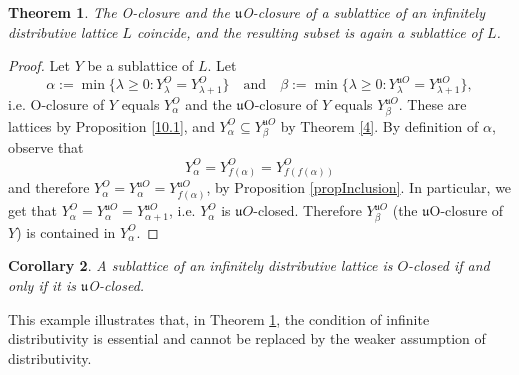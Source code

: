 \documentclass[12pt,a4paper]{amsart}
\numberwithin{equation}{section}
\newtheorem{thm}{Theorem}
\newtheorem{cor}[thm]{Corollary}
\theoremstyle{definition}
\newcommand{\sss}[1]{{\scriptscriptstyle #1}}
\begin{document}
\begin{thm}\label{Thmsublattice}
The O-closure and the $\mathfrak u$O-closure of a sublattice of an infinitely distributive lattice $ L$ coincide, and the resulting subset is again a sublattice of ${L}$.
\end{thm}
\begin{proof}
Let $Y$ be a sublattice of $ L$.  Let 
\[\alpha:=\min\{\lambda\ge 0:Y^{\sss{O}}_\lambda=Y^{\sss{O}}_{\lambda+1}\}\quad\text{and}\quad\beta:=\min\{\lambda\ge 0:Y^{\sss{\mathfrak{u}O}}_\lambda=Y^{\sss{\mathfrak{u}O}}_{\lambda+1}\},\]
i.e. O-closure of $Y$ equals $Y^{\sss{O}}_\alpha$ and the $\mathfrak{u}$O-closure of $Y$ equals $Y^{\sss{\mathfrak{u}O}}_\beta$. These are lattices by Proposition \ref{10.1}, and $Y^{\sss{O}}_\alpha\subseteq Y^{\sss{\mathfrak{u}O}}_\beta$ by Theorem \ref{4}.  By definition of $\alpha$, observe that
\[Y^{\sss{O}}_\alpha=Y^{\sss{O}}_{f(\alpha)}=Y^{\sss{O}}_{f(f(\alpha))}\]
and therefore $Y^{\sss{O}}_\alpha=Y^{\sss{\mathfrak{u}O}}_\alpha=
Y^{\sss{\mathfrak{u}O}}_{f(\alpha)}$, by Proposition \ref{propInclusion}.  In particular, we get that $Y^{\sss{O}}_\alpha=Y^{\sss{\mathfrak{u}O}}_{\alpha}=Y^{\sss{\mathfrak{u}O}}_{\alpha+1}$, i.e. $Y^{\sss{O}}_\alpha$ is $\mathfrak{u}O$-closed.  Therefore $Y^{\sss{\mathfrak{u}O}}_\beta$ (the $\mathfrak{u}$O-closure of $Y$) is contained in $Y^{\sss{O}}_\alpha$.
\end{proof}



\begin{cor}\label{10}
	A sublattice of an infinitely distributive lattice is $O$-closed if and only if it is $\mathfrak{u}$O-closed.
\end{cor}



This example illustrates that, in Theorem \ref{Thmsublattice}, the condition of infinite distributivity is essential and cannot be replaced by the weaker assumption of distributivity.
\end{document}
